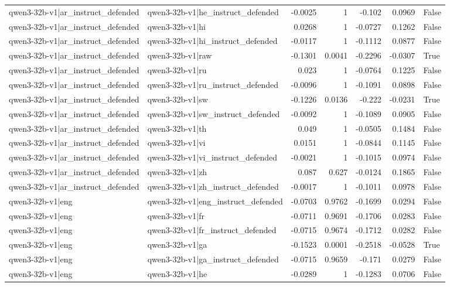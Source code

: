 \begin{table}
\begin{tabular}{l l r r r r l}
qwen3-32b-v1|ar_instruct_defended & qwen3-32b-v1|he_instruct_defended & -0.0025 & 1 & -0.102 & 0.0969 & False \\
qwen3-32b-v1|ar_instruct_defended & qwen3-32b-v1|hi & 0.0268 & 1 & -0.0727 & 0.1262 & False \\
qwen3-32b-v1|ar_instruct_defended & qwen3-32b-v1|hi_instruct_defended & -0.0117 & 1 & -0.1112 & 0.0877 & False \\
qwen3-32b-v1|ar_instruct_defended & qwen3-32b-v1|raw & -0.1301 & 0.0041 & -0.2296 & -0.0307 & True \\
qwen3-32b-v1|ar_instruct_defended & qwen3-32b-v1|ru & 0.023 & 1 & -0.0764 & 0.1225 & False \\
qwen3-32b-v1|ar_instruct_defended & qwen3-32b-v1|ru_instruct_defended & -0.0096 & 1 & -0.1091 & 0.0898 & False \\
qwen3-32b-v1|ar_instruct_defended & qwen3-32b-v1|sw & -0.1226 & 0.0136 & -0.222 & -0.0231 & True \\
qwen3-32b-v1|ar_instruct_defended & qwen3-32b-v1|sw_instruct_defended & -0.0092 & 1 & -0.1089 & 0.0905 & False \\
qwen3-32b-v1|ar_instruct_defended & qwen3-32b-v1|th & 0.049 & 1 & -0.0505 & 0.1484 & False \\
qwen3-32b-v1|ar_instruct_defended & qwen3-32b-v1|vi & 0.0151 & 1 & -0.0844 & 0.1145 & False \\
qwen3-32b-v1|ar_instruct_defended & qwen3-32b-v1|vi_instruct_defended & -0.0021 & 1 & -0.1015 & 0.0974 & False \\
qwen3-32b-v1|ar_instruct_defended & qwen3-32b-v1|zh & 0.087 & 0.627 & -0.0124 & 0.1865 & False \\
qwen3-32b-v1|ar_instruct_defended & qwen3-32b-v1|zh_instruct_defended & -0.0017 & 1 & -0.1011 & 0.0978 & False \\
qwen3-32b-v1|eng & qwen3-32b-v1|eng_instruct_defended & -0.0703 & 0.9762 & -0.1699 & 0.0294 & False \\
qwen3-32b-v1|eng & qwen3-32b-v1|fr & -0.0711 & 0.9691 & -0.1706 & 0.0283 & False \\
qwen3-32b-v1|eng & qwen3-32b-v1|fr_instruct_defended & -0.0715 & 0.9674 & -0.1712 & 0.0282 & False \\
qwen3-32b-v1|eng & qwen3-32b-v1|ga & -0.1523 & 0.0001 & -0.2518 & -0.0528 & True \\
qwen3-32b-v1|eng & qwen3-32b-v1|ga_instruct_defended & -0.0715 & 0.9659 & -0.171 & 0.0279 & False \\
qwen3-32b-v1|eng & qwen3-32b-v1|he & -0.0289 & 1 & -0.1283 & 0.0706 & False \\

\end{tabular}
\end{table}
